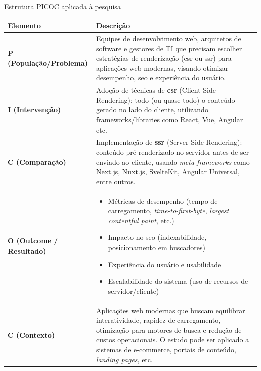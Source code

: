 \begin{quadro}[H]
\centering

\setlength{\tabcolsep}{0.8em} %
\renewcommand{\arraystretch}{1.5} %
\caption{Estrutura PICOC aplicada à pesquisa}
\begin{tabular}{|p{1.5in}|p{4.2in}|}
\hline
\textbf{Elemento} & \textbf{Descrição} \\ \hline

\textbf{P (População/Problema)} & 
Equipes de desenvolvimento web, arquitetos de software e gestores de TI que precisam escolher estratégias de renderização (\acrshort{csr} ou \acrshort{ssr}) para aplicações web modernas, visando otimizar desempenho, \acrshort{seo} e experiência do usuário. 
\\ \hline

\textbf{I (Intervenção)} & 
Adoção de técnicas de \textbf{\acrshort{csr}} (Client-Side Rendering): todo (ou quase todo) o conteúdo gerado no lado do cliente, utilizando frameworks/libraries como React, Vue, Angular etc.
\\ \hline

\textbf{C (Comparação)} & 
Implementação de \textbf{\acrshort{ssr}} (Server-Side Rendering): conteúdo pré-renderizado no servidor antes de ser enviado ao cliente, usando \emph{meta-frameworks} como Next.js, Nuxt.js, SvelteKit, Angular Universal, entre outros.
\\ \hline

\textbf{O (Outcome / Resultado)} & 
\begin{itemize}
  \item Métricas de desempenho (tempo de carregamento, \textit{time-to-first-byte}, \textit{largest contentful paint}, etc.)
  \item Impacto no \acrshort{seo} (indexabilidade, posicionamento em buscadores)
  \item Experiência do usuário e usabilidade
  \item Escalabilidade do sistema (uso de recursos de servidor/cliente)
\end{itemize}
\\ \hline

\textbf{C (Contexto)} & 
Aplicações web modernas que buscam equilibrar interatividade, rapidez de carregamento, otimização para motores de busca e redução de custos operacionais. O estudo pode ser aplicado a sistemas de e-commerce, portais de conteúdo, \emph{landing pages}, etc.
\\ \hline

\end{tabular}
\label{quad:quadro_picoc}
\end{quadro}


